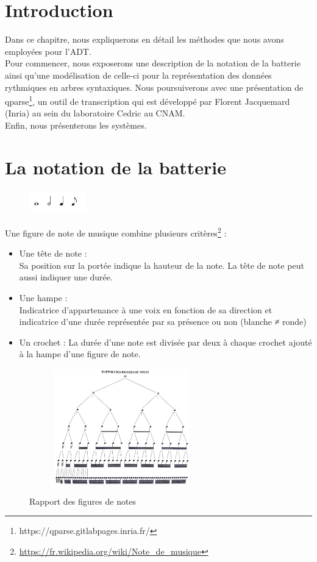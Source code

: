 \section*{Introduction}
Dans ce chapitre, nous expliquerons en détail les méthodes que nous avons employées pour l’ADT.\\
Pour commencer, nous exposerons une description de la notation de la batterie ainsi qu’une modélisation de celle-ci pour la représentation des données rythmiques en arbres syntaxiques. Nous poursuiverons avec une présentation de qparse\footnote{https://qparse.gitlabpages.inria.fr/}, un outil de transcription qui est développé par Florent Jacquemard (Inria) au sein du laboratoire Cedric au CNAM.\\
Enfin, nous présenterons les systèmes. 
\section{La notation de la batterie}
\begin{figure}[h]
	\centering
	\includegraphics[height=10mm, width=25mm]{z_images/3_methodes/0_notation_de_la_batterie/0_figures_de_notes.png}
\end{figure}
Une figure de note \cite{danhauser} de musique combine plusieurs critères\footnote{\url{https://fr.wikipedia.org/wiki/Note_de_musique}} :
\begin{itemize}
	\item Une tête de note :\\
	Sa position sur la portée indique la hauteur de la note. La tête de note peut aussi indiquer une durée.
	\item Une hampe :\\
	Indicatrice d’appartenance à une voix en fonction de sa direction et indicatrice d’une durée représentée par sa présence ou non (blanche ≠ ronde)
	\item Un crochet : La durée d’une note est divisée par deux à chaque crochet ajouté à la hampe d’une figure de note.
\end{itemize}
\begin{figure}[h]
	\centering
	\includegraphics[height=50mm, width=80mm]{z_images/3_methodes/0_notation_de_la_batterie/1_rapport_figures_notes.png}
	\caption{Rapport des figures de notes}\cite{danhauser}
	\label{rapp_fig_notes}
\end{figure}
